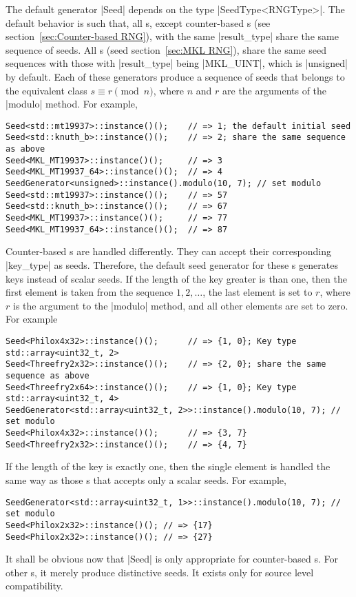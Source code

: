 The default generator |Seed| depends on the type |SeedType<RNGType>|. The
default behavior is such that, all \rng{}s, except counter-based \rng{}s (see
section~\ref{sec:Counter-based RNG}), with the same |result_type| share the
same sequence of seeds. All \mkl \rng{}s (seed section~\ref{sec:MKL RNG}),
share the same seed sequences with those with |result_type| being |MKL_UINT|,
which is |unsigned| by default. Each of these generators produce a sequence of
seeds that belongs to the equivalent class $s \equiv r \pmod{n}$, where $n$ and
$r$ are the arguments of the |modulo| method. For example,
\begin{verbatim}
Seed<std::mt19937>::instance()();    // => 1; the default initial seed
Seed<std::knuth_b>::instance()();    // => 2; share the same sequence as above
Seed<MKL_MT19937>::instance()();     // => 3
Seed<MKL_MT19937_64>::instance()();  // => 4
SeedGenerator<unsigned>::instance().modulo(10, 7); // set modulo
Seed<std::mt19937>::instance()();    // => 57
Seed<std::knuth_b>::instance()();    // => 67
Seed<MKL_MT19937>::instance()();     // => 77
Seed<MKL_MT19937_64>::instance()();  // => 87
\end{verbatim}
Counter-based \rng{}s are handled differently. They can accept their
corresponding |key_type| as seeds. Therefore, the default seed generator for
these \rng{}s generates keys instead of scalar seeds. If the length of the key
greater is than one, then the first element is taken from the sequence
$1,2,\dots$, the last element is set to $r$, where $r$ is the argument to the
|modulo| method, and all other elements are set to zero. For example
\begin{verbatim}
Seed<Philox4x32>::instance()();      // => {1, 0}; Key type std::array<uint32_t, 2>
Seed<Threefry2x32>::instance()();    // => {2, 0}; share the same sequence as above
Seed<Threefry2x64>::instance()();    // => {1, 0}; Key type std::array<uint32_t, 4>
SeedGenerator<std::array<uint32_t, 2>>::instance().modulo(10, 7); // set modulo
Seed<Philox4x32>::instance()();      // => {3, 7}
Seed<Threefry2x32>::instance()();    // => {4, 7}
\end{verbatim}
If the length of the key is exactly one, then the single element is handled the
same way as those \rng{}s that accepts only a scalar seeds. For example,
\begin{verbatim}
SeedGenerator<std::array<uint32_t, 1>>::instance().modulo(10, 7); // set modulo
Seed<Philox2x32>::instance()(); // => {17}
Seed<Philox2x32>::instance()(); // => {27}
\end{verbatim}
It shall be obvious now that |Seed| is only appropriate for counter-based
\rng{}s. For other \rng{}s, it merely produce distinctive seeds. It exists only
for source level compatibility.

